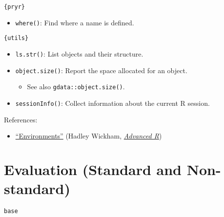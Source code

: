 \documentclass[
]{book}
\providecommand{\tightlist}{%
  \setlength{\itemsep}{0pt}\setlength{\parskip}{0pt}}
\begin{document}
\texttt{\{pryr\}}

\begin{itemize}
\tightlist
\item
  \texttt{where()}: Find where a name is defined.
\end{itemize}

\texttt{\{utils\}}

\begin{itemize}
\tightlist
\item
  \texttt{ls.str()}: List objects and their structure.
\item
  \texttt{object.size()}: Report the space allocated for an object.

  \begin{itemize}
  \tightlist
  \item
    See also \texttt{gdata::object.size()}.
  \end{itemize}
\item
  \texttt{sessionInfo()}: Collect information about the current R session.
\end{itemize}

References:

\begin{itemize}
\tightlist
\item
  \href{http://adv-r.had.co.nz/Environments.html\#environments}{``Environments''} (Hadley Wickham, \href{http://adv-r.had.co.nz/}{\emph{Advanced R}})
\end{itemize}

\hypertarget{evaluation-standard-and-non-standard}{%
\section{Evaluation (Standard and Non-standard)}\label{evaluation-standard-and-non-standard}}

\texttt{base}
\end{document}
